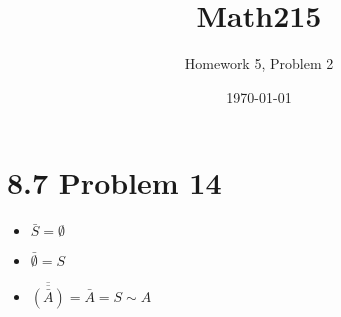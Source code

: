 \documentclass{article} %
\title{Math215} %
\author{Homework 5, Problem 2} %
\date{\today}
\begin{document}
\maketitle %

\section*{8.7 Problem 14} %
\begin{itemize}
\item $\bar{S} = \emptyset$
\item $\bar{\emptyset} = S$
\item $\overline{\overline{(\bar{A})}} = \bar{A} = S \sim A$
\end{itemize}
\end{document}
